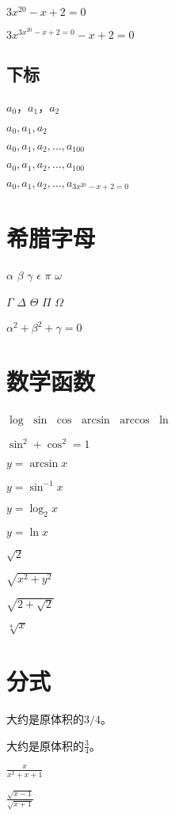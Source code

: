 \documentclass{article}
\begin{document}
	$3x^{20}-x+2=0$
	
	$3x^{3x^{20}-x+2=0}-x+2=0$
	
	\subsection{下标}
	
	$a_0$，$a_1$，$a_2$
	
	$a_0,a_1,a_2$
	
	$a_0,a_1,a_2,...,a_100$ %
	
	$a_0,a_1,a_2,...,a_{100}$
	
	$a_0,a_1,a_2,...,a_{3x^{20}-x+2=0}$
	
	\section{希腊字母}
	
	$\alpha$
	$\beta$
	$\gamma$
	$\epsilon$
	$\pi$
	$\omega$
	
	$\Gamma$
	$\Delta$
	$\Theta$
	$\Pi$
	$\Omega$
	
	$\alpha^2 + \beta^2 + \gamma = 0$
	
	\section{数学函数}
	
	$\log$
	$\sin$
	$\cos$
	$\arcsin$
	$\arccos$
	$\ln$
	
	$\sin^2 + \cos^2 = 1$
	
	$y = \arcsin x$
	
	$y = \sin^{-1} x$
	
	$y = \log_2 x$
	
	$y = \ln x$
	
	$\sqrt{2}$
	
	$\sqrt{x^2 + y^2}$
	
	$\sqrt{2 + \sqrt{2}}$
		
	$\sqrt[4]{x}$
	
	\section{分式}
	
	大约是原体积的$3/4$。
	
	大约是原体积的$\frac{3}{4}$。
	
	$\frac{x}{x^2 + x + 1}$
	
	$\frac{\sqrt{x - 1}}{\sqrt{x + 1}}$
	
\end{document}
